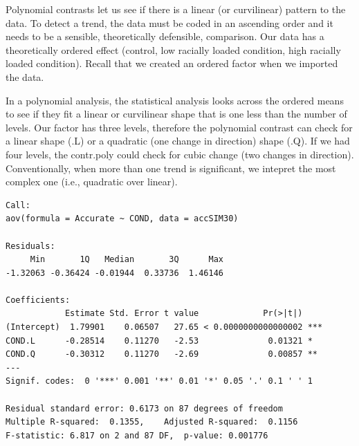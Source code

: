 \documentclass[
  english,
]{book}
\newenvironment{Shaded}{\begin{snugshade}}{\end{snugshade}}
\newcommand{\AttributeTok}[1]{\textcolor[rgb]{0.77,0.63,0.00}{#1}}
\newcommand{\DecValTok}[1]{\textcolor[rgb]{0.00,0.00,0.81}{#1}}
\newcommand{\FunctionTok}[1]{\textcolor[rgb]{0.00,0.00,0.00}{#1}}
\newcommand{\NormalTok}[1]{#1}
\newcommand{\OtherTok}[1]{\textcolor[rgb]{0.56,0.35,0.01}{#1}}
\newcommand{\SpecialCharTok}[1]{\textcolor[rgb]{0.00,0.00,0.00}{#1}}
\begin{document}
Polynomial contrasts let us see if there is a linear (or curvilinear) pattern to the data. To detect a trend, the data must be coded in an ascending order and it needs to be a sensible, theoretically defensible, comparison. Our data has a theoretically ordered effect (control, low racially loaded condition, high racially loaded condition). Recall that we created an ordered factor when we imported the data.

In a polynomial analysis, the statistical analysis looks across the ordered means to see if they fit a linear or curvilinear shape that is one less than the number of levels. Our factor has three levels, therefore the polynomial contrast can check for a linear shape (.L) or a quadratic (one change in direction) shape (.Q). If we had four levels, the contr.poly could check for cubic change (two changes in direction). Conventionally, when more than one trend is significant, we intepret the most complex one (i.e., quadratic over linear).

\begin{Shaded}
\end{Shaded}

\begin{verbatim}
Call:
aov(formula = Accurate ~ COND, data = accSIM30)

Residuals:
     Min       1Q   Median       3Q      Max 
-1.32063 -0.36424 -0.01944  0.33736  1.46146 

Coefficients:
            Estimate Std. Error t value             Pr(>|t|)    
(Intercept)  1.79901    0.06507   27.65 < 0.0000000000000002 ***
COND.L      -0.28514    0.11270   -2.53              0.01321 *  
COND.Q      -0.30312    0.11270   -2.69              0.00857 ** 
---
Signif. codes:  0 '***' 0.001 '**' 0.01 '*' 0.05 '.' 0.1 ' ' 1

Residual standard error: 0.6173 on 87 degrees of freedom
Multiple R-squared:  0.1355,    Adjusted R-squared:  0.1156 
F-statistic: 6.817 on 2 and 87 DF,  p-value: 0.001776
\end{verbatim}
\end{document}
